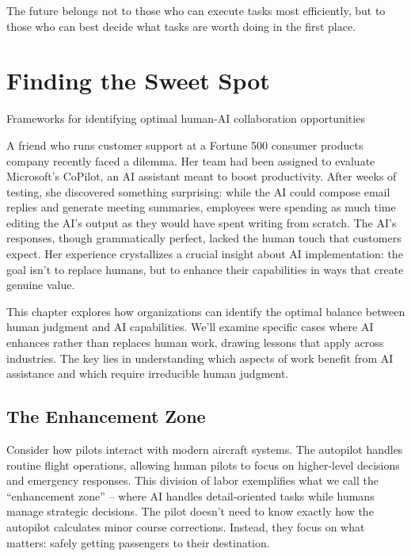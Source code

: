 \documentclass[
  Letterpaper,
]{scrbook}
\begin{document}
The future belongs not to those who can execute tasks most efficiently,
but to those who can best decide what tasks are worth doing in the first
place.


\chapter{Finding the Sweet Spot}\label{finding-the-sweet-spot}

Frameworks for identifying optimal human-AI collaboration opportunities

\hfill\break

A friend who runs customer support at a Fortune 500 consumer products
company recently faced a dilemma. Her team had been assigned to evaluate
Microsoft's CoPilot, an AI assistant meant to boost productivity. After
weeks of testing, she discovered something surprising: while the AI
could compose email replies and generate meeting summaries, employees
were spending as much time editing the AI's output as they would have
spent writing from scratch. The AI's responses, though grammatically
perfect, lacked the human touch that customers expect. Her experience
crystallizes a crucial insight about AI implementation: the goal isn't
to replace humans, but to enhance their capabilities in ways that create
genuine value.

This chapter explores how organizations can identify the optimal balance
between human judgment and AI capabilities. We'll examine specific cases
where AI enhances rather than replaces human work, drawing lessons that
apply across industries. The key lies in understanding which aspects of
work benefit from AI assistance and which require irreducible human
judgment.

\section{The Enhancement Zone}\label{the-enhancement-zone}

Consider how pilots interact with modern aircraft systems. The autopilot
handles routine flight operations, allowing human pilots to focus on
higher-level decisions and emergency responses. This division of labor
exemplifies what we call the ``enhancement zone'' -- where AI handles
detail-oriented tasks while humans manage strategic decisions. The pilot
doesn't need to know exactly how the autopilot calculates minor course
corrections. Instead, they focus on what matters: safely getting
passengers to their destination.
\end{document}
